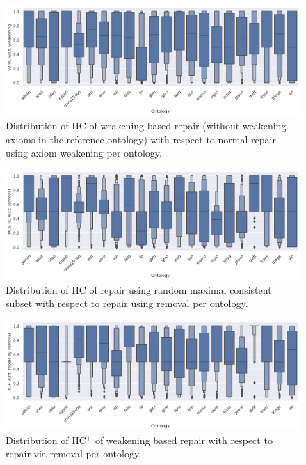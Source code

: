 \begin{figure}[htbp]
  \centering
  \includegraphics[width=\textwidth]{resources/iic-enhance-weaken-ontology-violin.png}
  \caption{Distribution of IIC of weakening based repair (without weakening axioms in the reference ontology) with respect to normal repair using axiom weakening per ontology.}
\end{figure}

\begin{figure}[htbp]
  \centering
  \includegraphics[width=\textwidth]{resources/iic-mcs-rem-ontology-violin.png}
  \caption{Distribution of IIC of repair using random maximal consistent subset with respect to repair using removal per ontology.}
\end{figure}

\begin{figure}[htbp]
  \centering
  \includegraphics[width=\textwidth]{resources/eiic-remove-ontology-violin.png}
  \caption{Distribution of IIC$^+$ of weakening based repair with respect to repair via removal per ontology.}
\end{figure}

